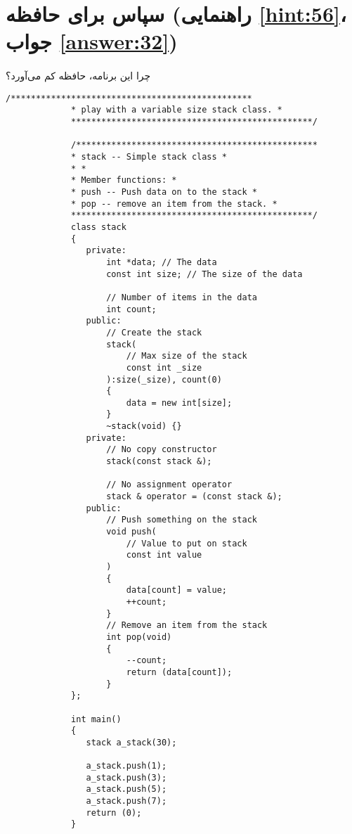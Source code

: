 \section[سپاس برای حافظه]{سپاس برای حافظه \protect{} (راهنمایی \ref{hint:56}، جواب \ref{answer:32})}
\paragraph{}\label{prog:81}
چرا این برنامه، حافظه کم می‌آورد؟

\begin{LTR}
        \begin{lstlisting}[style=C++Style]
             /************************************************
             * play with a variable size stack class. *
             ************************************************/

             /************************************************
             * stack -- Simple stack class *
             * *
             * Member functions: *
             * push -- Push data on to the stack *
             * pop -- remove an item from the stack. *
             ************************************************/
             class stack
             {
             	private:
             		int *data; // The data
             		const int size; // The size of the data

             		// Number of items in the data
             		int count;
             	public:
             		// Create the stack
             		stack(
             			// Max size of the stack
             			const int _size
             		):size(_size), count(0)
             		{
             			data = new int[size];
             		}
             		~stack(void) {}
             	private:
             		// No copy constructor
             		stack(const stack &);

             		// No assignment operator
             		stack & operator = (const stack &);
             	public:
             		// Push something on the stack
             		void push(
            			// Value to put on stack
             			const int value
             		)
             		{
             			data[count] = value;
             			++count;
             		}
            		// Remove an item from the stack
             		int pop(void)
             		{
             			--count;
             			return (data[count]);
             		}
             };

             int main()
             {
             	stack a_stack(30);

             	a_stack.push(1);
             	a_stack.push(3);
             	a_stack.push(5);
             	a_stack.push(7);
             	return (0);
             }
        \end{lstlisting}
\end{LTR}